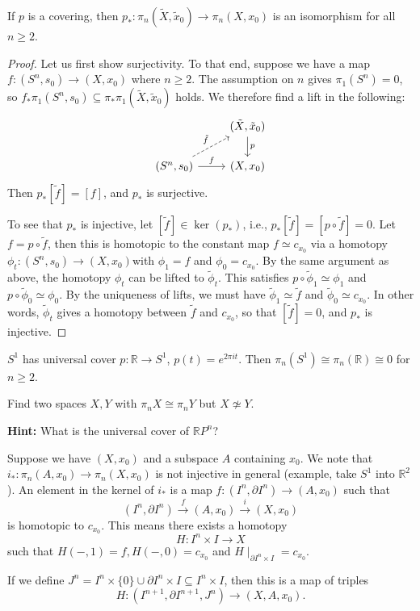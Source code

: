 \documentclass[ma3408.tex]{subfiles}
\begin{document}
\begin{Prop}
	If $p$ is a covering, then $p_* \colon \pi_n(\tilde X,\tilde x_0) \to \pi_n(X,x_0)$ is an isomorphism for all $ n \ge 2$. 
\end{Prop}
\begin{proof}
Let us first show surjectivity. To that end, suppose we have a map $f \colon (S^n,s_0) \to (X,x_0)$ where $n \ge 2$. The assumption on  $n$ gives $\pi_1(S^n) = 0$, so $f_*\pi_1(S^n,s_0) \subseteq \pi_*\pi_1(\tilde X,\tilde x_0)$ holds. We therefore find a lift in the following:
\[\begin{tikzcd}
	& {(\tilde X,\tilde x_0)} \\
	{(S^n,s_0)} & {(X,x_0)}
	\arrow["f", from=2-1, to=2-2]
	\arrow["p", from=1-2, to=2-2]
	\arrow["{\tilde f}", dashed, from=2-1, to=1-2]
\end{tikzcd}\]
Then $p_*[\tilde f] = [f]$, and $p_*$ is surjective. 

To see that $p_*$ is injective, let $[\tilde f] \in \ker(p_*)$, i.e., $p_*[\tilde f] = [p \circ \tilde f] = 0$. Let $f = p \circ \tilde f$, then this is homotopic to the constant map $f \simeq c_{x_0}$ via a homotopy $\phi_t \colon (S^n,s_0) \to (X,x_0)$with $\phi_1 =f $ and $\phi_0 = c_{x_0}$. By the same argument as above, the homotopy $\phi_t$ can be lifted to $\tilde \phi_t$. This satisfies $p \circ \tilde \phi_1 \simeq \phi_1 $ and $p \circ \tilde \phi_0 \simeq \phi_0$. By the uniqueness of lifts, we must have $\tilde \phi_1 \simeq \tilde f$ and $\tilde \phi_0 \simeq c_{x_0}$. In other words, $\tilde \phi_t$ gives a homotopy between $\tilde f$ and $c_{x_0}$, so that $[\tilde f]  = 0$, and $p_*$ is injective. 
\end{proof}
\begin{Exa}
	$S^1$ has universal cover $p \colon \mathbb{R} \to S^1$, $p(t) = e^{2\pi i t}$. Then $\pi_n(S^1) \cong \pi_n(\mathbb{R}) \cong 0$ for $n \ge 2$. 
\end{Exa}
\begin{exercise}{}{}
	Find two spaces $X,Y$ with $\pi_nX \cong \pi_nY$ but $X \not \simeq Y$. 

	\textbf{Hint: } What is the universal cover of $\mathbb{R}P^n$?
\end{exercise}
\begin{Rem}
	Suppose we have $(X,x_0)$ and a subspace $A$ containing $x_0$. We note that $i_* \colon \pi_n(A,x_0) \to \pi_n(X,x_0)$ is not injective in general (example, take $S^1$ into $\mathbb{R}^2$). An element in the kernel of $i_*$ is a map $f \colon (I^n,\partial I^n) \to (A,x_0)$ such that 
	\[
(I^n,\partial I^n) \xrightarrow{f} (A,x_0) \xrightarrow{i} (X,x_0)
	\] 
	is homotopic to $c_{x_0}$. This means there exists a homotopy
	\[
H \colon I^n \times I \to X
	\]
	such that $H(-,1) = f, H(-,0) = c_{x_0}$ and $H \mid_{\partial I^n \times I} = c_{x_0}$. 

	If we define $J^n = I^n \times \{ 0 \} \cup \partial I^n \times I \subseteq I^n \times I$, then this is a map of triples
	\[
H \colon (I^{n+1},\partial I^{n+1},J^n) \to (X,A,x_0). 
	\] 
\end{Rem}
\end{document}
